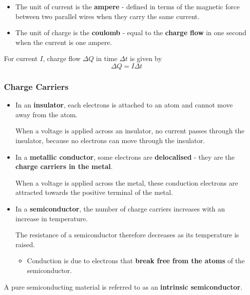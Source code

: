 \begin{itemize}
    \item The unit of current is the \textbf{ampere} - defined in terms of the magnetic force between two parallel wires when they carry the same current.
    \item The unit of charge is the \textbf{coulomb} - equal to the \textbf{charge flow} in one second when the current is one ampere.
\end{itemize}

For current $I$, charge flow $\Delta Q$ in time $\Delta t$ is given by
$$\Delta Q=I\Delta t$$

\subsubsection*{Charge Carriers}
\begin{itemize}
    \item In an \textbf{insulator}, each electrons is attached to an atom and cannot move away from the atom.

        When a voltage is applied across an insulator, no current passes through the insulator, because no electrons can move through the insulator.
    \item In a \textbf{metallic conductor}, some electrons are \textbf{delocalised} - they are the \textbf{charge carriers in the metal}.

        When a voltage is applied across the metal, these conduction electrons are attracted towards the positive terminal of the metal.
    \item In a \textbf{semiconductor}, the number of charge carriers increases with an increase in temperature.
        
        The resistance of a semiconductor therefore decreases as its temperature is raised.
        \begin{itemize}
            \item Conduction is due to electrons that \textbf{break free from the atoms} of the semiconductor.
        \end{itemize}
\end{itemize}

A pure semiconducting material is referred to as an \textbf{intrinsic semiconductor}.
